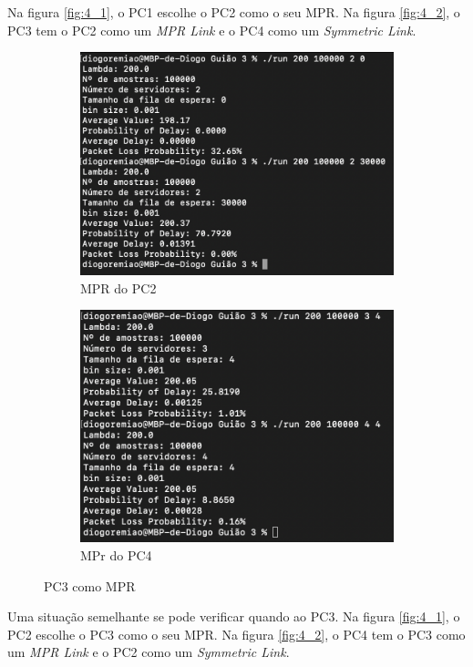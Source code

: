 Na figura \ref{fig:4_1}, o PC1 escolhe o PC2 como o seu MPR.
Na figura \ref{fig:4_2}, o PC3 tem o PC2 como um \textit{MPR Link} e o PC4 como um \textit{Symmetric Link}.

\begin{figure}[H]
    \centering
    \begin{subfigure}{.5\textwidth}
      \centering
      \includegraphics[width=.9\linewidth]{figs/image_5.png}
      \caption{MPR do PC2}
      \label{fig:5_1}
    \end{subfigure}%
    \begin{subfigure}{.5\textwidth}
      \centering
      \includegraphics[width=.9\linewidth]{figs/image_6.png}
      \caption{MPr do PC4}
      \label{fig:5_2}
    \end{subfigure}
    \caption{PC3 como MPR}
    \label{fig:5}
\end{figure}

Uma situação semelhante se pode verificar quando ao PC3.
Na figura \ref{fig:4_1}, o PC2 escolhe o PC3 como o seu MPR.
Na figura \ref{fig:4_2}, o PC4 tem o PC3 como um \textit{MPR Link} e o PC2 como um \textit{Symmetric Link}.


